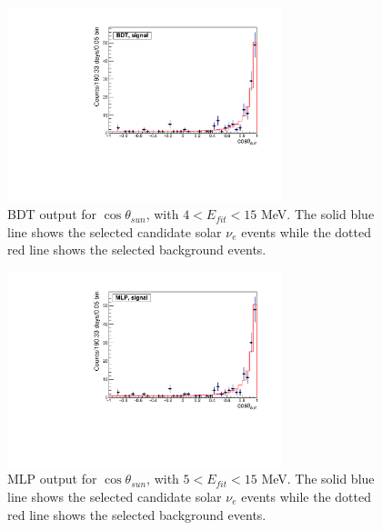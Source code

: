 \begin{figure}[!htb]
	\centering
	\includegraphics[width=8cm]{cosThetaToSun_5to15_BDT.pdf}
	\caption[BDT output for $\cos\theta_{sun}$, with $4<E_{fit}<15$ MeV.]{BDT output for $\cos\theta_{sun}$, with $4<E_{fit}<15$ MeV. The solid blue line shows the selected candidate solar $\nu_e$ events while the dotted red line shows the selected background events.}
	\label{cosThetaToSun_5to15_BDT}
\end{figure}

\begin{figure}[!htb]
	\centering
	\includegraphics[width=8cm]{cosThetaToSun_5to15_MLP.pdf}
	\caption[MLP output for $\cos\theta_{sun}$, with $5<E_{fit}<15$ MeV.]{MLP output for $\cos\theta_{sun}$, with $5<E_{fit}<15$ MeV. The solid blue line shows the selected candidate solar $\nu_e$ events while the dotted red line shows the selected background events.}
	\label{cosThetaToSun_5to15_MLP}
\end{figure}




